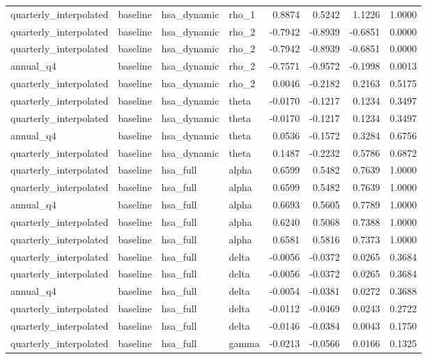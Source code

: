 \begin{tabular}{llllrrrr}
quarterly\_interpolated & baseline & hsa\_dynamic & rho\_1 & 0.8874 & 0.5242 & 1.1226 & 1.0000 \\
quarterly\_interpolated & baseline & hsa\_dynamic & rho\_2 & -0.7942 & -0.8939 & -0.6851 & 0.0000 \\
quarterly\_interpolated & baseline & hsa\_dynamic & rho\_2 & -0.7942 & -0.8939 & -0.6851 & 0.0000 \\
annual\_q4 & baseline & hsa\_dynamic & rho\_2 & -0.7571 & -0.9572 & -0.1998 & 0.0013 \\
quarterly\_interpolated & baseline & hsa\_dynamic & rho\_2 & 0.0046 & -0.2182 & 0.2163 & 0.5175 \\
quarterly\_interpolated & baseline & hsa\_dynamic & theta & -0.0170 & -0.1217 & 0.1234 & 0.3497 \\
quarterly\_interpolated & baseline & hsa\_dynamic & theta & -0.0170 & -0.1217 & 0.1234 & 0.3497 \\
annual\_q4 & baseline & hsa\_dynamic & theta & 0.0536 & -0.1572 & 0.3284 & 0.6756 \\
quarterly\_interpolated & baseline & hsa\_dynamic & theta & 0.1487 & -0.2232 & 0.5786 & 0.6872 \\
quarterly\_interpolated & baseline & hsa\_full & alpha & 0.6599 & 0.5482 & 0.7639 & 1.0000 \\
quarterly\_interpolated & baseline & hsa\_full & alpha & 0.6599 & 0.5482 & 0.7639 & 1.0000 \\
annual\_q4 & baseline & hsa\_full & alpha & 0.6693 & 0.5605 & 0.7789 & 1.0000 \\
quarterly\_interpolated & baseline & hsa\_full & alpha & 0.6240 & 0.5068 & 0.7388 & 1.0000 \\
quarterly\_interpolated & baseline & hsa\_full & alpha & 0.6581 & 0.5816 & 0.7373 & 1.0000 \\
quarterly\_interpolated & baseline & hsa\_full & delta & -0.0056 & -0.0372 & 0.0265 & 0.3684 \\
quarterly\_interpolated & baseline & hsa\_full & delta & -0.0056 & -0.0372 & 0.0265 & 0.3684 \\
annual\_q4 & baseline & hsa\_full & delta & -0.0054 & -0.0381 & 0.0272 & 0.3688 \\
quarterly\_interpolated & baseline & hsa\_full & delta & -0.0112 & -0.0469 & 0.0243 & 0.2722 \\
quarterly\_interpolated & baseline & hsa\_full & delta & -0.0146 & -0.0384 & 0.0043 & 0.1750 \\
quarterly\_interpolated & baseline & hsa\_full & gamma & -0.0213 & -0.0566 & 0.0166 & 0.1325 \\

\end{tabular}
